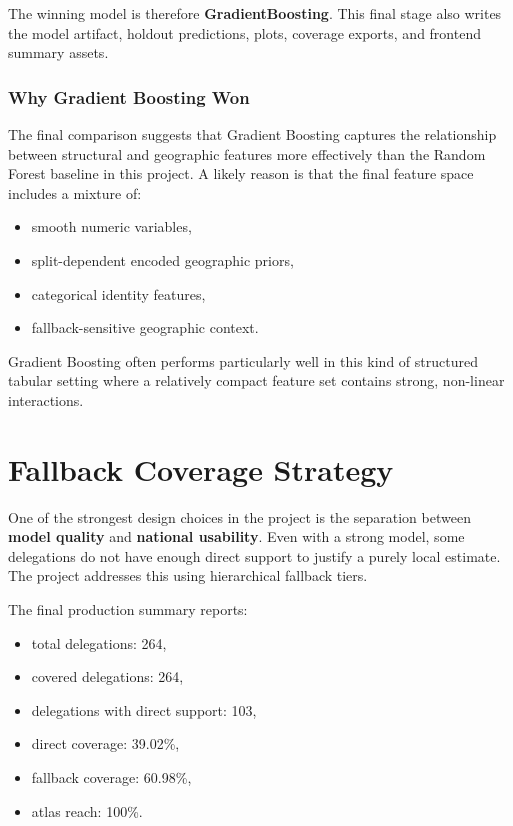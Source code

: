\documentclass[11pt,a4paper]{article}
\newcommand{\highlight}[1]{\textcolor{BrandRedDark}{\textbf{#1}}}
\begin{document}
The winning model is therefore \highlight{GradientBoosting}. This final stage also writes the model artifact, holdout predictions, plots, coverage exports, and frontend summary assets.

\subsubsection{Why Gradient Boosting Won}

The final comparison suggests that Gradient Boosting captures the relationship between structural and geographic features more effectively than the Random Forest baseline in this project. A likely reason is that the final feature space includes a mixture of:

\begin{itemize}
\item smooth numeric variables,
\item split-dependent encoded geographic priors,
\item categorical identity features,
\item fallback-sensitive geographic context.
\end{itemize}

Gradient Boosting often performs particularly well in this kind of structured tabular setting where a relatively compact feature set contains strong, non-linear interactions.

\section{Fallback Coverage Strategy}

One of the strongest design choices in the project is the separation between \highlight{model quality} and \highlight{national usability}. Even with a strong model, some delegations do not have enough direct support to justify a purely local estimate. The project addresses this using hierarchical fallback tiers.

The final production summary reports:

\begin{itemize}
\item total delegations: 264,
\item covered delegations: 264,
\item delegations with direct support: 103,
\item direct coverage: 39.02\%,
\item fallback coverage: 60.98\%,
\item atlas reach: 100\%.
\end{itemize}
\end{document}
